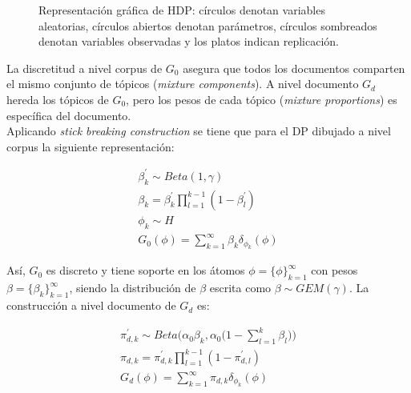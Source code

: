 \documentclass[letterpaper,12pt,oneside]{book} %
\begin{document}
\begin{figure}
  \centering
\caption{Representación gráfica de HDP: círculos denotan variables aleatorias, círculos abiertos denotan parámetros, círculos sombreados denotan variables observadas y los platos indican replicación.}
\label{img:hdp}
\end{figure}

La discretitud a nivel corpus de $G_{0}$ asegura que todos los documentos comparten el mismo conjunto de tópicos (\textit{mixture components}). A nivel documento $G_{d}$ hereda los tópicos de $G_{0}$, pero los pesos de cada tópico (\textit{mixture proportions}) es específica del documento.\\

Aplicando \textit{stick breaking construction} se tiene que para el DP dibujado a nivel corpus la siguiente representación:

\begin{align}
    \beta_{k}^{'} \sim Beta(1, \gamma) \\
    \beta_{k} = \beta_{k}^{'}\prod_{l=1}^{k-1}(1-\beta_{l}^{'})\\
    \phi_{k} \sim H  \\
    G_{0}(\phi)=\sum_{k=1}^{\infty}\beta_{k}\delta_{\phi_{k}}(\phi)
\end{align}


Así, $G_{0}$ es discreto y tiene soporte en los átomos $\phi = \{\phi\}_{k=1}^{\infty}$ con pesos $\beta=\{\beta_{k}\}_{k=1}^{\infty}$, siendo la distribución de $\beta$ escrita como $\beta \sim GEM(\gamma)$. La construcción a nivel documento de $G_{d}$ es:

\begin{align}
    \pi_{d,k}^{'}\sim Beta\big(\alpha_{0}\beta_{k}, \alpha_{0}\big(1-\sum_{l=1}^{k}\beta_{l}\big)\big)\\
    \pi_{d,k} = \pi_{d,k}^{'}\prod_{l=1}^{k-1}(1-\pi_{d,l}^{'})\\
    G_{d}(\phi)=\sum_{k=1}^{\infty}\pi_{d,k}\delta_{\phi_{k}}(\phi)
\end{align}
\end{document}
